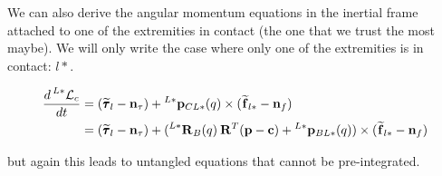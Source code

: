 \documentclass[11pt]{article}
\newcommand{\Rot}[2]{\prescript{#1}{}{\bfR}_{#2}}
\newcommand{\noise}{\bfn}
\newcommand{\posi}[2]{\prescript{#1}{}{\bfp}_{#2}}
\newcommand{\forcem}[2]{\prescript{#1}{}{\widetilde{\bff}}_{#2}}
\newcommand{\torquem}[2]{\prescript{#1}{}{\widetilde{\pmb{\tau}}}_{#2}}
\newcommand{\AM}{\mathcal{L}}
\newcommand{\COM}{\bfc}
\begin{document}
We can also derive the angular momentum equations in the inertial frame attached to one of the extremities in contact (the one that we trust the most maybe). We will only write the case where only one of the extremities is in contact: \(l*\).

\begin{equation}
\begin{split}
    \frac{d \prescript{L*}{}{\AM}_c}{dt} &=
    (\torquem{}{l} - \noise_{\tau}) + \posi{L*}{CL*}(q) \times (\forcem{}{l*} - \noise_f)
    \\
    &= (\torquem{}{l} - \noise_{\tau}) + (\Rot{L*}{B}(q)\Rot{}{}^T(\bfp - \COM) + \posi{L*}{BL*}(q)) \times (\forcem{}{l*} - \noise_f)
\end{split}
\end{equation}
 
but again this leads to untangled equations that cannot be pre-integrated.




\end{document}
